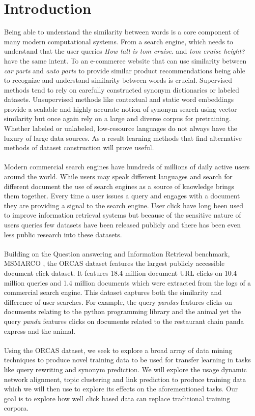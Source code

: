 \section{Introduction}
Being able to understand the similarity between words is a core component of many modern computational systems. From a search engine, which needs to understand that the user queries \textit{How tall is tom cruise.} and \textit{tom cruise height?} have the same intent. To an e-commerce website that can use similarity between \textit{car parts} and \textit{auto parts} to provide similar product recommendations being able to recognize and understand similarity between words is crucial. Supervised methods tend to rely on carefully constructed synonym dictionaries or labeled datasets. Unsupervised methods like contextual \cite{Devlin2019BERTPO} and static word embeddings \cite{Mikolov2013DistributedRO}  provide a scalable and highly accurate notion of synonym search using vector similarity but once again rely on a large and diverse corpus for pretraining. Whether labeled or unlabeled, low-resource languages do not always have the luxury of large data sources. As a result learning methods that find alternative methods of dataset construction will prove useful. \\ \\
Modern commercial search engines have hundreds of millions of daily active users around the world. While users may speak different languages and search for different document the use of search engines as a source of knowledge brings them together. Every time a user issues a query and engages with a document they are providing a signal to the search engine. User click have long been used to improve information retrieval systems \cite{Chuklin2013ClickMI} but because of the sensitive nature of users queries few datasets have been released publicly and there has been even less public research into these datasets. \\ \\
Building on the Question answering and Information Retrieval benchmark, MSMARCO \cite{Campos2016MSMA}, the ORCAS \cite{Craswell2020ORCAS2M} dataset features the largest publicly accessible document click dataset. It features 18.4 million document URL clicks on 10.4 million queries and 1.4 million documents which were extracted from the logs of a commercial search engine. This dataset captures both the similarity and difference of user searches. For example, the query \textit{pandas} features clicks on documents relating to the python programming library and the animal yet the query \textit{panda} features clicks on documents related to the restaurant chain panda express and the animal. \\ \\
Using the ORCAS dataset, we seek to explore a broad array of data mining techniques to produce novel training data to be used for transfer learning in tasks like query rewriting and synonym prediction. We will explore the usage dynamic network alignment, topic clustering and link prediction to produce training data which we will then use to explore its effects on the aforementioned tasks. Our goal is to explore how well click based data can replace traditional training corpora. \\